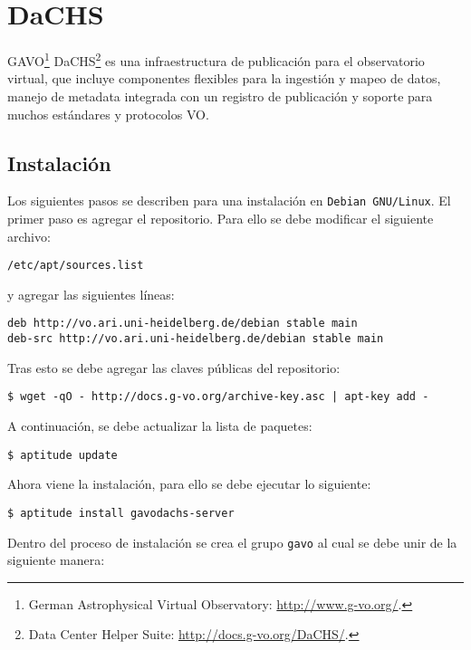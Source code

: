 \section{DaCHS}\label{anx:dachs}

GAVO\footnote{German Astrophysical Virtual Observatory: \url{http://www.g-vo.org/}.} DaCHS\footnote{Data Center Helper Suite: \url{http://docs.g-vo.org/DaCHS/}.} es una infraestructura de publicación para el observatorio virtual, que incluye componentes flexibles para la ingestión y mapeo de datos, manejo de metadata integrada con un registro de publicación y soporte para muchos estándares y protocolos VO.

\subsection*{Instalación}

Los siguientes pasos se describen para una instalación en \verb;Debian GNU/Linux;. El primer paso es agregar el repositorio. Para ello se debe modificar el siguiente archivo:

\begin{verbatim}
/etc/apt/sources.list
\end{verbatim}

\noindent y agregar las siguientes líneas:

\begin{verbatim}
deb http://vo.ari.uni-heidelberg.de/debian stable main
deb-src http://vo.ari.uni-heidelberg.de/debian stable main
\end{verbatim}

Tras esto se debe agregar las claves públicas del repositorio:

\begin{verbatim}
$ wget -qO - http://docs.g-vo.org/archive-key.asc | apt-key add -
\end{verbatim}

A continuación, se debe actualizar la lista de paquetes:

\begin{verbatim}
$ aptitude update
\end{verbatim}

Ahora viene la instalación, para ello se debe ejecutar lo siguiente:

\begin{verbatim}
$ aptitude install gavodachs-server
\end{verbatim}

Dentro del proceso de instalación se crea el grupo \verb;gavo; al cual se debe unir de la siguiente manera:

